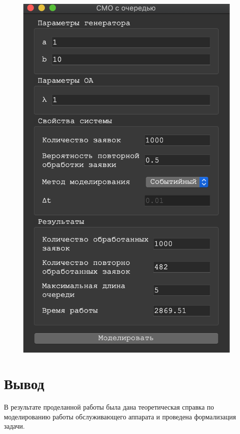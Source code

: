 \documentclass[a4paper,12pt]{article}
\begin{document}
\begin{figure}[h!]
\begin{minipage}[b]{0.32\textwidth}
			\includegraphics[width=\textwidth]{sob_3_3.png}
		\end{minipage}
		\label{ris:sob_3}
	\end{figure}

	\newpage
	
	\section*{Вывод}
	
	В результате проделанной работы была дана теоретическая справка по моделированию работы обслуживающего аппарата и проведена формализация задачи.
	
\end{document}
